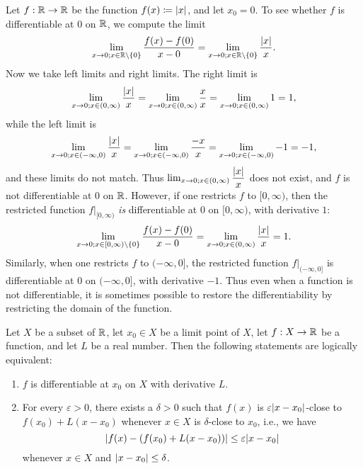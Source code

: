 \begin{eg}\label{10.1.6}
  Let \(f : \mathbb{R} \to \mathbb{R}\) be the function \(f(x) \coloneqq \left\lvert x\right\rvert\), and let \(x_0 = 0\).
  To see whether \(f\) is differentiable at \(0\) on \(\mathbb{R}\), we compute the limit
  \[
    \lim_{x \to 0 ; x \in \mathbb{R} \setminus \left\lbrace0\right\rbrace} \dfrac{f(x) - f(0)}{x - 0} = \lim_{x \to 0 ; x \in \mathbb{R} \setminus \left\lbrace0\right\rbrace} \dfrac{\left\lvert x\right\rvert}{x}.
  \]
  Now we take left limits and right limits.
  The right limit is
  \[
    \lim_{x \to 0 ; x \in (0, \infty)} \dfrac{\left\lvert x\right\rvert}{x} = \lim_{x \to 0 ; x \in (0, \infty)} \dfrac{x}{x} = \lim_{x \to 0 ; x \in (0, \infty)} 1 = 1,
  \]
  while the left limit is
  \[
    \lim_{x \to 0 ; x \in (-\infty, 0)} \dfrac{\left\lvert x\right\rvert}{x} = \lim_{x \to 0 ; x \in (-\infty, 0)} \dfrac{-x}{x} = \lim_{x \to 0 ; x \in (-\infty, 0)} -1 = -1,
  \]
  and these limits do not match.
  Thus \(\lim_{x \to 0 ; x \in (0, \infty)} \dfrac{\left\lvert x\right\rvert}{x}\) does not exist, and \(f\) is not differentiable at \(0\) on \(\mathbb{R}\).
  However, if one restricts \(f\) to \([0, \infty)\), then the restricted function \(f|_{[0, \infty)}\) \emph{is} differentiable at \(0\) on \([0, \infty)\), with derivative \(1\):
  \[
  \lim_{x \to 0 ; x \in [0, \infty) \setminus \left\lbrace0\right\rbrace} \dfrac{f(x) - f(0)}{x - 0} = \lim_{x \to 0 ; x \in (0, \infty)} \dfrac{\left\lvert x\right\rvert}{x} = 1.
    \]
    Similarly, when one restricts \(f\) to \((-\infty, 0]\), the restricted function \(f|_{(-\infty, 0]}\) is differentiable at \(0\) on \((-\infty, 0]\), with derivative \(-1\).
  Thus even when a function is not differentiable, it is sometimes possible to restore the differentiability by restricting the domain of the function.
\end{eg}

\begin{prop}\label{10.1.7}
  Let \(X\) be a subset of \(\mathbb{R}\), let \(x_0 \in X\) be a limit point of \(X\), let \(f : X \to \mathbb{R}\) be a function, and let \(L\) be a real number.
  Then the following statements are logically equivalent:
  \begin{enumerate}
    \item \(f\) is differentiable at \(x_0\) on \(X\) with derivative \(L\).
    \item For every \(\varepsilon > 0\), there exists a \(\delta > 0\) such that \(f(x)\) is \(\varepsilon \abs{x - x_0}\)-close to \(f(x_0) + L(x - x_0)\) whenever \(x \in X\) is \(\delta\)-close to \(x_0\), i.e., we have
          \[
            \abs{f(x) - (f(x_0) + L(x - x_0))} \leq \varepsilon \abs{x - x_0}
          \]
          whenever \(x \in X\) and \(\left\lvert x - x_0\right\rvert \leq \delta\).
  \end{enumerate}
\end{prop}

